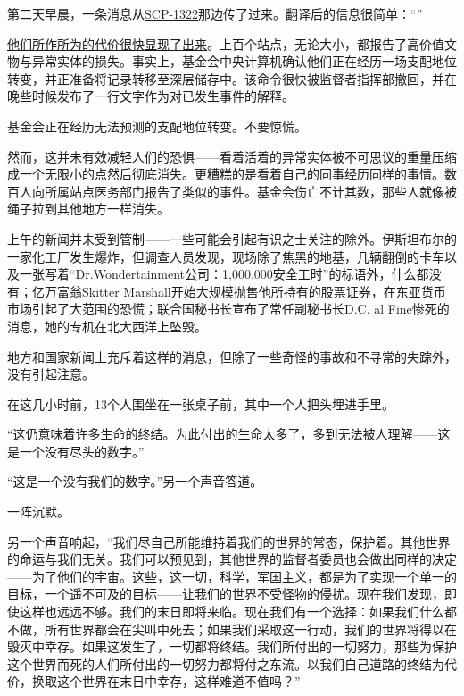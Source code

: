 \hr

第二天早晨，一条消息从\hyperref[chap:SCP-1322]{SCP-1322}那边传了过来。翻译后的信息很简单：“”

\hyperref[sec:SCP-001.atonement]{他们所作所为的代价很快显现了出来}。上百个站点，无论大小，都报告了高价值文物与异常实体的损失。事实上，基金会中央计算机确认他们正在经历一场支配地位转变，并正准备将记录转移至深层储存中。该命令很快被监督者指挥部撤回，并在晚些时候发布了一行文字作为对已发生事件的解释。

\begin{scpbox}

基金会正在经历无法预测的支配地位转变。不要惊慌。

\end{scpbox}

然而，这并未有效减轻人们的恐惧——看着活着的异常实体被不可思议的重量压缩成一个无限小的点然后彻底消失。更糟糕的是看着自己的同事经历同样的事情。数百人向所属站点医务部门报告了类似的事件。基金会伤亡不计其数，那些人就像被绳子拉到其他地方一样消失。

上午的新闻并未受到管制——一些可能会引起有识之士关注的除外。伊斯坦布尔的一家化工厂发生爆炸，但调查人员发现，现场除了焦黑的地基，几辆翻倒的卡车以及一张写着“Dr.Wondertainment公司：1,000,000安全工时”的标语外，什么都没有；亿万富翁Skitter
 Marshall开始大规模抛售他所持有的股票证券，在东亚货币市场引起了大范围的恐慌；联合国秘书长宣布了常任副秘书长D.C. al Fine惨死的消息，她的专机在北大西洋上坠毁。

地方和国家新闻上充斥着这样的消息，但除了一些奇怪的事故和不寻常的失踪外，没有引起注意。

\hr

在这几小时前，13个人围坐在一张桌子前，其中一个人把头埋进手里。

“这仍意味着许多生命的终结。为此付出的生命太多了，多到无法被人理解——这是一个没有尽头的数字。”

“这是一个没有我们的数字。”另一个声音答道。

一阵沉默。

另一个声音响起，“我们尽自己所能维持着我们的世界的常态，保护着。其他世界的命运与我们无关。我们可以预见到，其他世界的监督者委员也会做出同样的决定——为了他们的宇宙。这些，这一切，科学，军国主义，都是为了实现一个单一的目标，一个遥不可及的目标——让我们的世界不受怪物的侵扰。现在我们发现，即使这样也远远不够。我们的末日即将来临。现在我们有一个选择：如果我们什么都不做，所有世界都会在尖叫中死去；如果我们采取这一行动，我们的世界将得以在毁灭中幸存。如果这发生了，一切都将终结。我们所付出的一切努力，那些为保护这个世界而死的人们所付出的一切努力都将付之东流。以我们自己道路的终结为代价，换取这个世界在末日中幸存，这样难道不值吗？”

